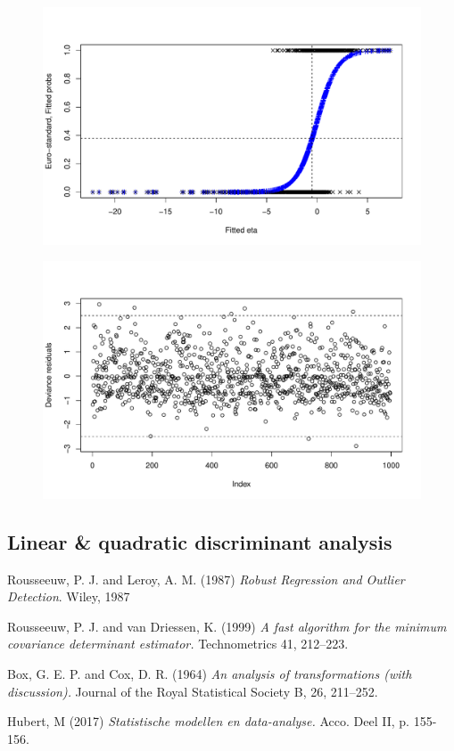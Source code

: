 \documentclass[a4paper, 12pt]{article}
\newcommand{\wide}[1]{\makebox[\textwidth][c]{#1}%
}
\begin{document}
\begin{table}
\centering
\wide{}
\caption{}
\label{table:lrm}
\end{table}

\begin{figure}
\centering
\includegraphics[width=0.7\linewidth]{fig/logistic_fit}
\caption{}
\label{fig:logisticfit}
\end{figure}
\begin{figure}
\centering
\includegraphics[width=0.7\linewidth]{fig/deviance_residuals}
\caption{}
\label{fig:devianceresiduals}
\end{figure}

\subsection*{Linear \& quadratic discriminant analysis}


\FloatBarrier
\begin{thebibliography}{9}
Rousseeuw, P. J. and Leroy, A. M.
(1987)
\textit{Robust Regression and Outlier Detection}. 
Wiley, 1987

Rousseeuw, P. J. and van Driessen, K.
(1999)
\textit{A fast algorithm for the minimum covariance determinant estimator.}
Technometrics 41, 212–223.

Box, G. E. P. and Cox, D. R.
(1964)
\textit{An analysis of transformations (with discussion).} Journal of the Royal Statistical Society B, 26, 211–252.

Hubert, M
(2017)
\textit{Statistische modellen en data-analyse.}
Acco. Deel II, p. 155-156.
\end{thebibliography}
\end{document}
